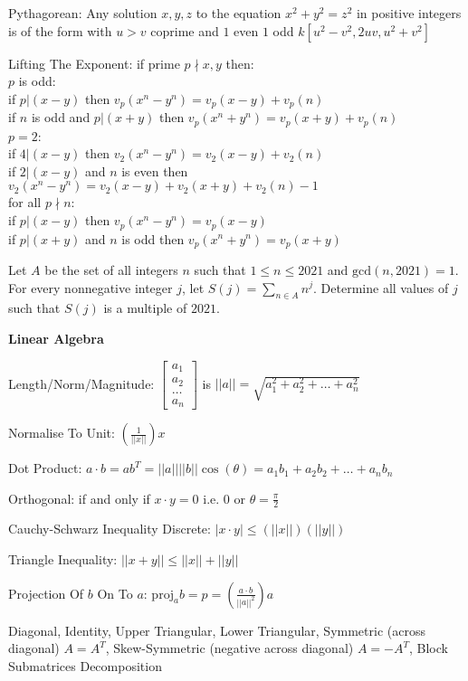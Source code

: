 Pythagorean: Any solution $x,y,z$ to the equation $x^2+y^2=z^2$ in positive integers is of the form with $u>v$ coprime and $1$ even $1$ odd $k[u^2-v^2,2uv,u^2+v^2]$

Lifting The Exponent: if prime $p \nmid x,y$ then: \\
$p$ is odd: \\
if $p|(x-y)$ then $v_p(x^n-y^n)=v_p(x-y)+v_p(n)$ \\
if $n$ is odd and $p|(x+y)$ then $v_p(x^n+y^n)=v_p(x+y)+v_p(n)$ \\
$p=2$: \\
if $4|(x-y)$ then $v_2(x^n-y^n)=v_2(x-y)+v_2(n)$ \\
if $2|(x-y)$ and $n$ is even then $v_2(x^n-y^n)=v_2(x-y)+v_2(x+y)+v_2(n)-1$ \\
for all $p \nmid n$: \\
if $p|(x-y)$ then $v_p(x^n-y^n)=v_p(x-y)$ \\
if $p|(x+y)$ and $n$ is odd then $v_p(x^n+y^n)=v_p(x+y)$

Let $A$ be the set of all integers $n$ such that $1 \le n \le 2021$ and $\text{gcd}(n,2021)=1$. For every nonnegative integer $j$, let $S(j)=\sum_{n \in A}n^j$. Determine all values of $j$ such that $S(j)$ is a multiple of $2021$.

\newpage

\textbf{Linear Algebra}

Length/Norm/Magnitude: $\begin{bmatrix} a_1 \\ a_2 \\ \dots \\ a_n \end{bmatrix}$ is $||a|| = \sqrt{a_1^2 + a_2^2 + \dots + a_n^2}$

Normalise To Unit: $\left( \frac{1}{||x||} \right) x$

Dot Product: $a \cdot b = a b^{T} = ||a|| ||b|| \cos(\theta) = a_1 b_1 + a_2 b_2 + \dots + a_n b_n$

Orthogonal: if and only if $x \cdot y =0$ i.e. $0$ or $\theta = \frac{\pi}{2}$

Cauchy-Schwarz Inequality Discrete: $|x \cdot y| \le (||x||)(||y||)$

Triangle Inequality: $||x+y|| \le ||x|| + ||y||$

Projection Of $b$ On To $a$: $\text{proj}_a b = p = \left(\frac{a \cdot b}{||a||^2} \right) a$

Diagonal, Identity, Upper Triangular, Lower Triangular, Symmetric (across diagonal) $A=A^T$, Skew-Symmetric (negative across diagonal) $A=-A^T$, Block Submatrices Decomposition

